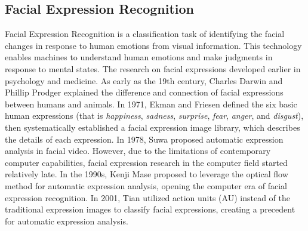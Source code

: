 \documentclass[10pt,twocolumn,letterpaper]{article}
\begin{document}
\subsection{Facial Expression Recognition}

	Facial Expression Recognition is a classification task of identifying the facial changes in response to human emotions from visual information. This technology enables machines to understand human emotions and make judgments in response to mental states. The research on facial expressions developed earlier in psychology and medicine. As early as the 19th century, Charles Darwin and Phillip Prodger \cite{darwin} explained the difference and connection of facial expressions between humans and animals. In 1971, Ekman and Friesen \cite{ekman} defined the six basic human expressions (that is \emph{happiness}, \emph{sadness}, \emph{surprise}, \emph{fear}, \emph{anger}, and \emph{disgust}), then systematically established a facial expression image library, which describes the details of each expression. In 1978, Suwa \etal \cite{suwa} proposed automatic expression analysis in facial video. However, due to the limitations of contemporary computer capabilities, facial expression research in the computer field started relatively late. In the 1990s, Kenji Mase \cite{mase} proposed to leverage the optical flow method for automatic expression analysis, opening the computer era of facial expression recognition. In 2001, Tian \etal \cite{tian} utilized action units (AU) instead of the traditional expression images to classify facial expressions, creating a precedent for automatic expression analysis. 
\end{document}
